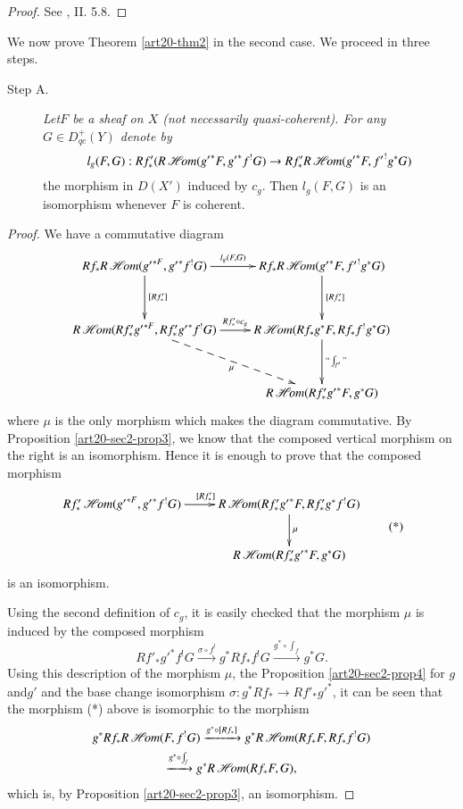 \begin{proof}
See \cite{art20-key1}, II. 5.8.
\end{proof}

We now prove Theorem \ref{art20-thm2} in the second case. We proceed in three steps.
\begin{description}
\item[Step A.] {\em Let\pageoriginale $F$ be a sheaf on $X$ (not necessarily quasi-coherent). For any $G\in D^{+}_{qc}(Y)$ denote by}
$$
l_{g}(F,G):Rf'_{*}(R\operatorname{\mathscr{H}\!\textit{om}}({g'}^{*}F,{g'}^{*}f^{!}G)\to Rf'_{*}R\operatorname{\mathscr{H}\!\textit{om}}({g'}^{*}F, {f'}^{!}g^{*}G)
$$
the morphism in $D(X')$ induced by $c_{g}$. Then $l_{g}(F,G)$ is an isomorphism whenever $F$ is coherent.
\end{description}

\begin{proof}
We have a commutative diagram
\[
\xymatrix@R=1.2cm{
Rf_{*}R\scrHom({g'}^{*F},{g'}^{*}f^{!}G)\ar[d]^-{[Rf'_{*}]}\ar[r]^-{l_{g}(F,G)} & Rf_{*}R\scrHom({g'}^{*}F,{f'}^{!}g^{*}G)\ar[d]^-{[Rf'_{*}]}\\
R\scrHom(Rf'_{*}{g'}^{*F},Rf'_{*}{g'}^{*}f^{!}G)\ar[r]^-{Rf'_{*}\circ c_{g}}\ar@{-->}[dr]_-{\mu} & R\scrHom(Rf_{*}g^{*}F,Rf_{*}f^{!}g^{*}G)\ar[d]^-{\text{``}\int_{f'}\text{''}}\\
 & R\scrHom(Rf'_{*}{g'}^{*}F,g^{*}G)
}
\]
where $\mu$ is the only morphism which makes the diagram commutative. By Proposition \ref{art20-sec2-prop3}, we know that the composed vertical morphism on the right is an isomorphism. Hence it is enough to prove that the composed morphism
\begin{equation*}
\vcenter{\xymatrix{
Rf'_{*}\scrHom({g'}^{*F},{g'}^{*}f^{!}G)\ar[r]^{[Rf'_{*}]} & R\scrHom(Rf'_{*}{g'}^{*}F,Rf'_{*}g^{*}f^{!}G)\ar[d]^-{\mu}\\
 & R\scrHom(Rf'_{*}{g'}^{*}F, g^{*}G)
}}\tag{*}
\end{equation*}
is an isomorphism.

Using the second definition of $c_{g}$, it is easily checked that the morphism $\mu$ is induced by the composed morphism
$$
Rf'_{*}{g'}^{*}f^{!}G\xrightarrow{\sigma\circ f^{!}}g^{*}Rf_{*}f^{!}G\xrightarrow{g^{*}\circ \int_{f}}g^{*}G.
$$
Using this description of the morphism $\mu$, the Proposition \ref{art20-sec2-prop4} for $g$ and\pageoriginale $g'$ and the base change isomorphism $\sigma:g^{*}Rf_{*}\to Rf'_{*}{g'}^{*}$, it can be seen that the morphism (*) above is isomorphic to the morphism 
\begin{gather*}
g^{*}Rf_{*}R\operatorname{\mathscr{H}\!\textit{om}}(F,f^{!}G)\xrightarrow{g^{*}\circ [Rf_{*}]}g^{*}R\operatorname{\mathscr{H}\!\textit{om}}(Rf_{*}F,Rf_{*}f^{!}G)\\
\xrightarrow{g^{*}\circ \int_{f}}g^{*}R\operatorname{\mathscr{H}\!\textit{om}}(Rf_{*}F,G),
\end{gather*}
which is, by Proposition \ref{art20-sec2-prop3}, an isomorphism.
\end{proof}

